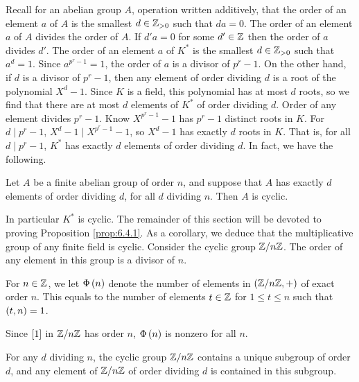 Recall for an abelian group $ A $, operation written additively, that the order of an element $ a $ of $ A $ is the smallest $ d \in \Z_{> 0} $ such that $ da = 0 $. The order of an element $ a $ of $ A $ divides the order of $ A $. If $ d'a = 0 $ for some $ d' \in \Z $ then the order of $ a $ divides $ d' $. The order of an element $ a $ of $ K^* $ is the smallest $ d \in \Z_{> 0} $ such that $ a^d = 1 $. Since $ a^{p^r - 1} = 1 $, the order of $ a $ is a divisor of $ p^r - 1 $. On the other hand, if $ d $ is a divisor of $ p^r - 1 $, then any element of order dividing $ d $ is a root of the polynomial $ X^d - 1 $. Since $ K $ is a field, this polynomial has at most $ d $ roots, so we find that there are at most $ d $ elements of $ K^* $ of order dividing $ d $. Order of any element divides $ p^r - 1 $. Know $ X^{p^r - 1} - 1 $ has $ p^r - 1 $ distinct roots in $ K $. For $ d \mid p^r - 1 $, $ X^d - 1 \mid X^{p^r - 1} - 1 $, so $ X^d - 1 $ has exactly $ d $ roots in $ K $. That is, for all $ d \mid p^r - 1 $, $ K^* $ has exactly $ d $ elements of order dividing $ d $. In fact, we have the following.

\begin{proposition}
\label{prop:6.4.1}
Let $ A $ be a finite abelian group of order $ n $, and suppose that $ A $ has exactly $ d $ elements of order dividing $ d $, for all $ d $ dividing $ n $. Then $ A $ is cyclic.
\end{proposition}

In particular $ K^* $ is cyclic. The remainder of this section will be devoted to proving Proposition \ref{prop:6.4.1}. As a corollary, we deduce that the multiplicative group of any finite field is cyclic. Consider the cyclic group $ \Z / n\Z $. The order of any element in this group is a divisor of $ n $.

\begin{definition}
For $ n \in \Z $, we let $ \Phi\rb{n} $ denote the number of elements in $ \rb{\Z / n\Z, +} $ of exact order $ n $. This equals to the number of elements $ t \in \Z $ for $ 1 \le t \le n $ such that $ \rb{t, n} = 1 $.
\end{definition}

\begin{note*}
Since $ \sb{1} $ in $ \Z / n\Z $ has order $ n $, $ \Phi\rb{n} $ is nonzero for all $ n $.
\end{note*}

\begin{lemma}
For any $ d $ dividing $ n $, the cyclic group $ \Z / n\Z $ contains a unique subgroup of order $ d $, and any element of $ \Z / n\Z $ of order dividing $ d $ is contained in this subgroup.
\end{lemma}

